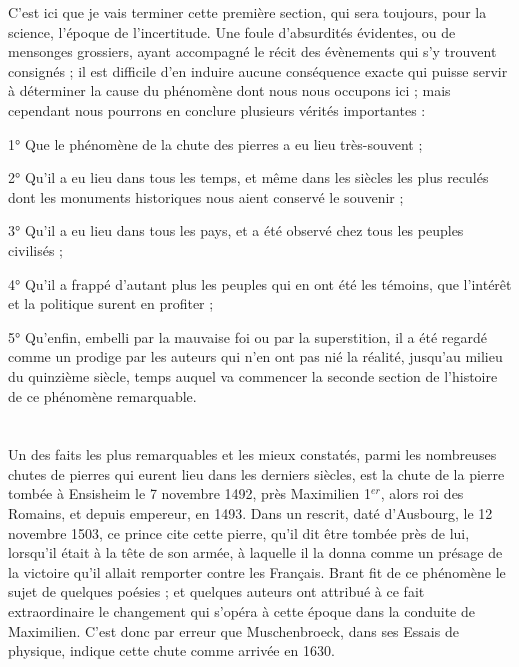 \documentclass[a4paper, 12pt, oneside, french]{article}
\begin{document}
C'est ici que je vais terminer cette première section, qui sera toujours, pour la science, l'époque de l'incertitude. Une foule d'absurdités évidentes, ou de mensonges grossiers, ayant accompagné le récit des évènements qui s'y trouvent consignés ; il est difficile d'en induire aucune conséquence exacte qui puisse servir à déterminer la cause du phénomène dont nous nous occupons ici ; mais cependant nous pourrons en conclure plusieurs vérités importantes :

1° Que le phénomène de la chute des pierres a eu lieu très-souvent ;

2° Qu'il a eu lieu dans tous les temps, et même dans les siècles les plus reculés dont les monuments historiques nous aient conservé le souvenir ;

3° Qu'il a eu lieu dans tous les pays, et a été observé chez tous les peuples civilisés ;

4° Qu'il a frappé d'autant plus les peuples qui en ont été les témoins, que l'intérêt et la politique surent en profiter ;

5° Qu'enfin, embelli par la mauvaise foi ou par la superstition, il a été regardé comme un prodige par les auteurs qui n'en ont pas nié la réalité, jusqu'au milieu du quinzième siècle, temps auquel va commencer la seconde section de l'histoire de ce phénomène remarquable.
\clearpage
\section{}
\paragraph{}
Un des faits les plus remarquables et les mieux constatés, parmi les nombreuses chutes de pierres qui eurent lieu dans les derniers siècles, est la chute de la pierre tombée à Ensisheim le 7 novembre 1492, près Maximilien 1$^{er}$, alors roi des Romains, et depuis empereur, en 1493. Dans un rescrit, daté d'Ausbourg, le 12 novembre 1503, ce prince cite cette pierre, qu'il dit être tombée près de lui, lorsqu'il était à la tête de son armée, à laquelle il la donna comme un présage de la victoire qu'il allait remporter contre les Français. Brant fit de ce phénomène le sujet de quelques poésies ; et quelques auteurs ont attribué à ce fait extraordinaire le changement qui s'opéra à cette époque dans la conduite de Maximilien. C'est donc par erreur que Muschenbroeck, dans ses Essais de physique, indique cette chute comme arrivée en 1630.
\end{document}
